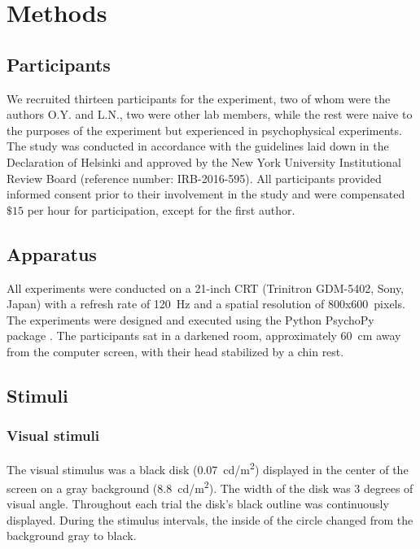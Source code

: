 \documentclass{jov}
\providecommand{\citep}[1]{\cite{#1}}
\begin{document}
\section{Methods}

\subsection{Participants}
We recruited thirteen participants for the experiment, two of whom were the authors O.Y. and L.N., two were other lab members, while the rest were naive to the purposes of the experiment but experienced in psychophysical experiments.
The study was conducted in accordance with the guidelines laid down in the Declaration of Helsinki and approved by the New York University Institutional Review Board (reference number: IRB-2016-595). All participants provided informed consent prior to their involvement in the study and were compensated $\$15$ per hour for participation, except for the first author.


\subsection{Apparatus}

All experiments were conducted on a 21-inch CRT (Trinitron GDM-5402, Sony, Japan) with a refresh rate of 120~Hz and a spatial resolution of 800x600~pixels. The experiments were designed and executed using the Python PsychoPy package \citep{peirce2007psychopy}. The participants sat in a darkened room, approximately 60~cm away from the computer screen, with their head stabilized by a chin rest.

\subsection{Stimuli}

\subsubsection{Visual stimuli}

The visual stimulus was a black disk (0.07~cd/m\textsuperscript{2}) displayed in the center of the screen on a gray background (8.8~cd/m\textsuperscript{2}). The width of the disk was 3 degrees of visual angle. Throughout each trial the disk's black outline was continuously displayed. During the stimulus intervals, the inside of the circle changed from the background gray to black.
\end{document}
